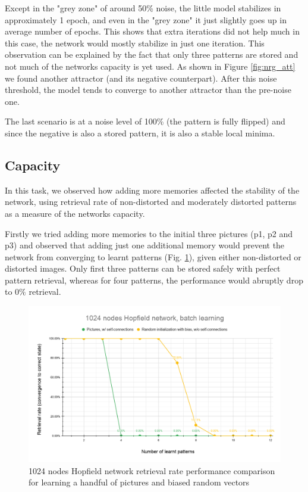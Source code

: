 \documentclass[a4paper]{article}
\begin{document}
Except in the "grey zone" of around 50\% noise, the little model stabilizes in approximately 1 epoch, and even in the "grey zone" it just slightly goes up in average number of epochs. This shows that extra iterations did not help much in this case, the network would mostly stabilize in just one iteration. This observation can be explained by the fact that only three patterns are stored and not much of the networks capacity is yet used. As shown in Figure \ref{fig:nrg_att} we found another attractor (and its negative counterpart). After this noise threshold, the model tends to converge to another attractor than the pre-noise one.

The last scenario is at a noise level of 100\% (the pattern is fully flipped) and since the negative is also a stored pattern, it is also a stable local minima.

\subsection{Capacity}

In this task, we observed how adding more memories affected the stability of the network, using retrieval rate of non-distorted and moderately distorted patterns as a measure of the networks capacity.

Firstly we tried adding more memories to the initial three pictures (p1, p2 and p3) and observed that adding just one additional memory would prevent the network from converging to learnt patterns (Fig. \ref{fig:pic_vs_biased_random}), given either non-distorted or distorted images. Only first three patterns can be stored safely with perfect pattern retrieval, whereas for four patterns, the performance would abruptly drop to $0\%$ retrieval.

\begin{figure}[h]
    \centering
    \includegraphics[width=0.8\linewidth]{img/6_pic_vs_biased_random.png}
    \caption{1024 nodes Hopfield network retrieval rate performance comparison for learning a handful of pictures and biased random vectors}
    \label{fig:pic_vs_biased_random}
\end{figure}
\end{document}
